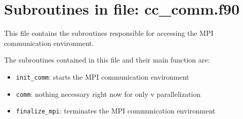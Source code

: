 \section{Subroutines in file: cc\_comm.f90}

This file contains the subroutines responsible for accessing the MPI communication environment.


\noindent The subroutines contained in this file and their main function are:

\begin{itemize}
\item \texttt{init\_comm}: starts the MPI communication environment

\item \texttt{comm}: nothing necessary right now for only v parallelization

\item \texttt{finalize\_mpi}: terminates the MPI communication environment

\end{itemize}

\bigskip
\titlerule \vspace{1pt} \titlerule
